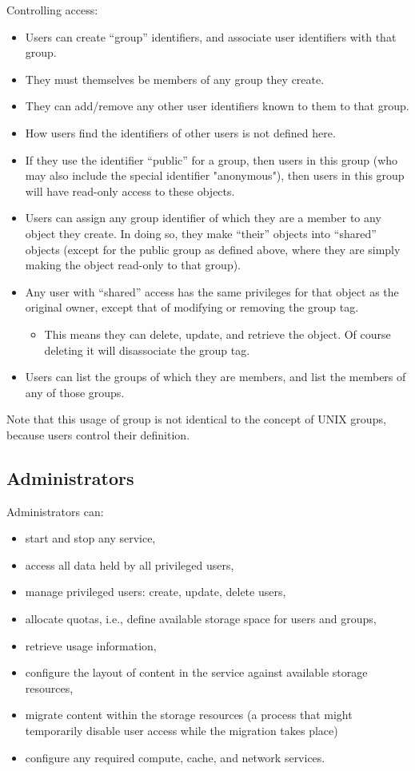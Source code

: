 Controlling access:
\begin{itemize}
	\item Users can create ``group'' identifiers, and associate user identifiers with that group.
	\item They must themselves be members of any group they create.
	\item They can add/remove any other user identifiers known to them to that group.
	\item How users find the identifiers of other users is not defined here.
	\item If they use the identifier ``public'' for a group, then users in this group (who may also include the special identifier "anonymous"), then users in this group will have read-only access to these objects.
	\item Users can assign any group identifier of which they are a member to any object they create. In doing so, they make ``their'' objects into ``shared'' objects (except for the public group as defined above, where they are simply making the object read-only to that group).
	\item Any user with ``shared'' access has the same privileges for that object as the original owner, except that of modifying or removing the group tag.
	\begin{itemize}
		\item This means they can delete, update, and retrieve the object. Of course deleting it will disassociate the group tag.
	\end{itemize}
	\item Users can list the groups of which they are members, and list the members of any of those groups.
\end{itemize}

Note that this usage of group is not identical to the concept of UNIX groups, because users control their definition.

\subsection*{Administrators}

Administrators can:

\begin{itemize}
	\item  start and stop any service,
	\item  access all data held by all privileged users,
	\item  manage privileged users: create, update, delete users,
	\item  allocate quotas, i.e., define available storage space for users and groups,
	\item  retrieve usage information,
	\item  configure the layout of content in the service against available storage resources,
	\item  migrate content within the storage resources (a process that might temporarily disable user access while the migration takes place)
	\item  configure any required compute, cache, and network services.
\end{itemize}


